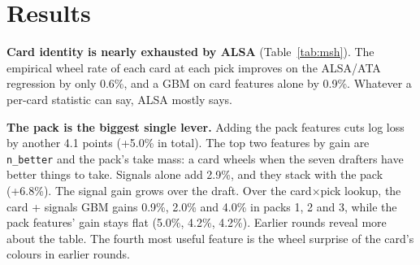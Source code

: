 \documentclass[10pt,letterpaper]{article}
\begin{document}
\section{Results}\label{sec:results}

\begin{table}[t]
\centering\small
\caption{MSH test (10,292 drafts, 1.95M passed cards, base wheel rate 33.3\%). Each LightGBM row adds a feature
group. ``vs ALSA'': relative log-loss reduction. Bold: best.}
\label{tab:msh}
\setlength{\tabcolsep}{2.6pt}
\end{table}

\textbf{Card identity is nearly exhausted by ALSA} (Table~\ref{tab:msh}). The empirical wheel rate of each card at
each pick improves on the ALSA/ATA regression by only 0.6\%, and a GBM on card features alone by 0.9\%. Whatever
a per-card statistic can say, ALSA mostly says.

\textbf{The pack is the biggest single lever.} Adding the pack features cuts log loss by another 4.1 points
(+5.0\% in total). The top two features by gain are \texttt{n\_better} and the pack's take mass: a card wheels when
the seven drafters have better things to take. Signals alone add 2.9\%, and they stack with the pack (+6.8\%).
The signal gain grows over the draft. Over the card$\times$pick lookup, the card + signals GBM gains 0.9\%, 2.0\%
and 4.0\% in packs 1, 2 and 3, while the pack features' gain stays flat (5.0\%, 4.2\%, 4.2\%). Earlier rounds
reveal more about the table. The fourth most useful feature is
the wheel surprise of the card's colours in earlier rounds.
\end{document}
